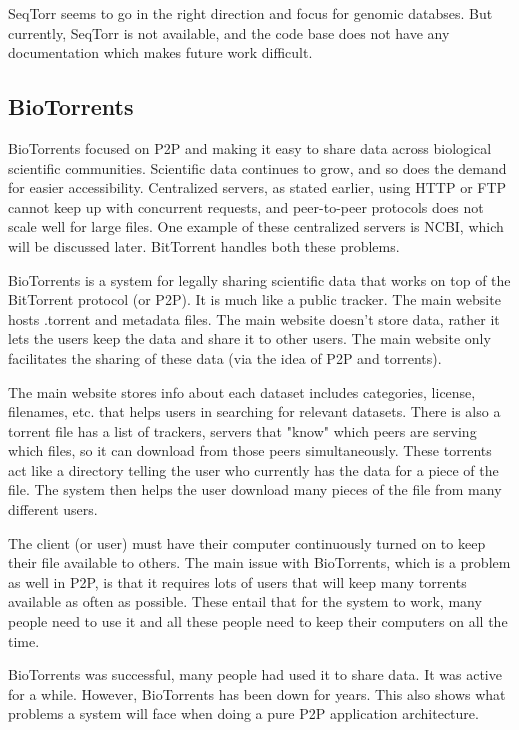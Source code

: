 \documentclass{article}
\begin{document}
SeqTorr seems to go in the right direction and focus for genomic databses. But currently, SeqTorr is not available, and the code base does not have any documentation which makes future work difficult.



\subsection{BioTorrents}
BioTorrents focused on P2P and making it easy to share data across biological scientific communities.  Scientific data continues to grow, and so does the demand for easier accessibility. Centralized servers, as stated earlier, using HTTP or FTP cannot keep up with concurrent requests, and peer-to-peer protocols does not scale well for large files.\autocite{biotorrents} One example of these centralized servers is NCBI, which will be discussed later. BitTorrent handles both these problems. 

BioTorrents is a system for legally sharing scientific data that works on top of the BitTorrent protocol (or P2P). It is much like a public tracker. The main website hosts .torrent and metadata files. The main website doesn't store data, rather it lets the users keep the data and share it to other users. The main website only facilitates the sharing of these data (via the idea of P2P and torrents).

The main website stores info about each dataset includes categories, license, filenames, etc. that helps users in searching for relevant datasets. There is also a torrent file has a list of trackers, servers that "know" which peers are serving which files, so it can download from those peers simultaneously. These torrents act like a directory telling the user who currently has the data for a piece of the file. The system then helps the user download many pieces of the file from many different users.

The client (or user) must have their computer continuously turned on to keep their file available to others. The main issue with BioTorrents, which is a problem as well in P2P, is that it requires lots of users that will keep many torrents available as often as possible.\autocite{biotorrents} These entail that for the system to work, many people need to use it and all these people need to keep their computers on all the time.

BioTorrents was successful, many people had used it to share data. It was active for a while. However, BioTorrents has been down for years. This also shows what problems a system will face when doing a pure P2P application architecture.
\end{document}
